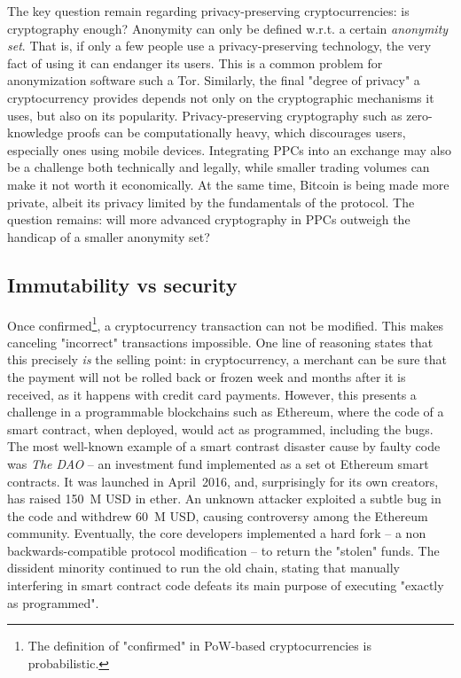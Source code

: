 The key question remain regarding privacy-preserving cryptocurrencies: is cryptography enough?
Anonymity can only be defined w.r.t. a certain \textit{anonymity set}.
That is, if only a few people use a privacy-preserving technology, the very fact of using it can endanger its users.
This is a common problem for anonymization software such a Tor.
Similarly, the final "degree of privacy" a cryptocurrency provides depends not only on the cryptographic mechanisms it uses, but also on its popularity.
Privacy-preserving cryptography such as zero-knowledge proofs can be computationally heavy, which discourages users, especially ones using mobile devices.
Integrating PPCs into an exchange may also be a challenge both technically and legally, while smaller trading volumes can make it not worth it economically.
At the same time, Bitcoin is being made more private, albeit its privacy limited by the fundamentals of the protocol.
The question remains: will more advanced cryptography in PPCs outweigh the handicap of a smaller anonymity set?


\subsection{Immutability vs security}

Once confirmed\footnote{The definition of "confirmed" in PoW-based cryptocurrencies is probabilistic.}, a cryptocurrency transaction can not be modified.
This makes canceling "incorrect" transactions impossible.
One line of reasoning states that this precisely \textit{is} the selling point: in cryptocurrency, a merchant can be sure that the payment will not be rolled back or frozen week and months after it is received, as it happens with credit card payments.
However, this presents a challenge in a programmable blockchains such as Ethereum, where the code of a smart contract, when deployed, would act as programmed, including the bugs.
The most well-known example of a smart contrast disaster cause by faulty code was \textit{The DAO} -- an investment fund implemented as a set ot Ethereum smart contracts.
It was launched in April~2016, and, surprisingly for its own creators, has raised 150~M USD in ether.
An unknown attacker exploited a subtle bug in the code and withdrew 60~M USD, causing controversy among the Ethereum community.
Eventually, the core developers implemented a hard fork -- a non backwards-compatible protocol modification -- to return the "stolen" funds.
The dissident minority continued to run the old chain, stating that manually interfering in smart contract code defeats its main purpose of executing "exactly as programmed".

